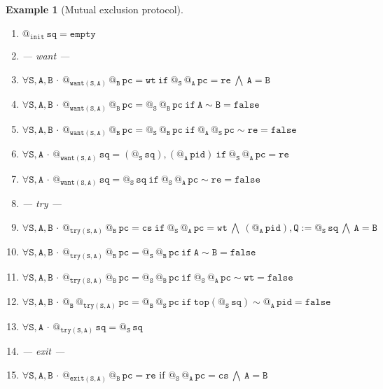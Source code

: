 \documentclass{article}
\makeatletter
\newcommand{\Q}{\mathtt{Q}}
\newcommand{\B}{\mathtt{B}}
\newcommand{\A}{\mathtt{A}}
\renewcommand{\S}{\mathtt{S}}
\newcommand{\pc}{{\mathtt{pc}}}
\newcommand{\pid}{{\mathtt{pid}}}
\newcommand{\sq}{{\mathtt{sq}}}
\newcommand{\re}{{\mathtt{re}}}
\newcommand{\wt}{{\mathtt{wt}}}
\newcommand{\cs}{{\mathtt{cs}}}
\newcommand{\Top}{{\mathtt{top}}}
\newcommand{\false}{{\mathtt{false}}}
\newcommand{\If}{{\ \mathtt{if}\ }}
\newcommand{\Empty}{{\mathtt{empty}}}
\newcommand{\init}{{\mathtt{init}}}
\newcommand{\want}{{\mathtt{want}}}
\newcommand{\try}{{\mathtt{try}}}
\newcommand{\exit}{{\mathtt{exit}}}
\newcommand{\at}[1]{@_{#1}\,}
\newcommand{\Forall}[1]{\forall #1\,{\cdot}\,}
\renewcommand{\land}{\ \bigwedge\ }
\newtheorem{example}{Example}
\makeatother
\begin{document}
\begin{example} [Mutual exclusion protocol]
\begin{enumerate}[label=(\arabic*),ref=\arabic*, leftmargin=*]
 \item \label{sen-4}$\at{\init}\sq=\Empty$ 
 
 \item[] --- want --- 

 \item \label{sen-5}$\Forall{\S,\A,\B} \at{\want(\S,\A)} \at{\B}  \pc=\wt \If \at{\S} \at{\A} \pc=\re \land \A=\B$
 
 \item \label{sen-6}$\Forall{\S,\A,\B} \at{\want(\S,\A)} \at{\B} \pc= \at{\S} \at{\B} \pc \If  \A \sim \B =\false $
 
 \item \label{sen-7}$\Forall{\S,\A,\B} \at{\want(\S,\A)} \at{\B}  \pc= \at{\S} \at{\B} \pc \If  \at{\A}\at{\S}\pc \sim \re =\false$
  
 \item \label{sen-8}$\Forall{\S,\A} \at{\want(\S,\A)}\sq = (\at{\S}\sq), (\at{\A} \pid) \If \at{\S} \at{\A} \pc=\re$

 \item \label{sen-9}$\Forall{\S,\A} \at{\want(\S,\A)}\sq = \at{\S}\sq \If \at{\S} \at{\A} \pc \sim \re=\false$  
 
 \item[] --- try ---

 \item \label{sen-10}$\Forall{\S,\A,\B} \at{\try(\S,\A)} \at{\B} \pc= \cs \If \at{\S} \at{\A} \pc = \wt \land (\at{\A}\pid), \Q := \at{\S} \sq \land \A = \B$
 
 \item \label{sen-11}$\Forall{\S,\A,\B} \at{\try(\S,\A)} \at{\B} \pc = \at{\S} \at{\B} \pc \If  \A \sim \B =\false$
 
 \item \label{sen-12}$\Forall{\S,\A,\B} \at{\try(\S,\A)} \at{\B} \pc=  \at{\S}  \at{\B} \pc \If \at{\S} \at{\A} \pc \sim \wt = \false$
  
 \item \label{sen-13}$\Forall{\S,\A,\B} \at{\B}\at{\try(\S,\A)}\pc= \at{\B} \at{\S} \pc \If  \Top(\at{\S}\sq) \sim \at{\A}\pid =\false $
  

 \item \label{sen-14}$\Forall{\S,\A} \at{\try(\S,\A)} \sq = \at{\S}\sq$  
 
 \item[] --- exit ---
 
 \item \label{sen-15}$\Forall{\S, \A,\B}  \at{\exit(\S,\A) }\at{\B}\pc = \re \text{ if } \at{\S} \at{\A} \pc = \cs \land \A = \B$
 

\end{enumerate}
\end{example}
\end{document}
